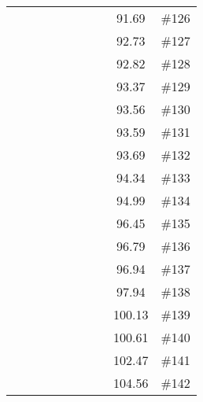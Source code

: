 \begin{longtable}{|c|c|c|c|c|c|c|c|c|c|}
 \x    & \x    &       & \x    &       &       &       & \x    & 91.69 & \#126 \\
 \x    & \x    & \x    &       &       & \x\m  &       &       & 92.73 & \#127 \\
 \x    & \x    &       & \x    &       &       & \x    &       & 92.82 & \#128 \\
 \x    & \x    &       & \x    &       & \x    & \x    &       & 93.37 & \#129 \\
 \x    & \x    &       & \x    &       &       & \x\m  &       & 93.56 & \#130 \\
 \x    & \x    &       & \x    &       & \x    &       & \x    & 93.59 & \#131 \\
 \x    & \x    &       & \x    &       &       &       &       & 93.69 & \#132 \\
 \x    & \x    &       &       &       &       &       & \x    & 94.34 & \#133 \\
 \x    & \x    &       &       &       &       &       &       & 94.99 & \#134 \\
 \x    & \x    &       & \x    &       &       &       & \x\m  & 96.45 & \#135 \\
 \x    & \x    &       &       &       & \x\m  &       &       & 96.79 & \#136 \\
 \x    & \x    &       &       &       &       & \x\m  &       & 96.94 & \#137 \\
 \x    & \x    &       &       &       & \x    &       &       & 97.94 & \#138 \\
 \x    & \x    &       & \x    &       & \x\m  &       & \x\m  & 100.13 & \#139 \\
 \x    & \x    &       & \x    &       & \x\m  & \x\m  &       & 100.61 & \#140 \\
 \x    & \x    &       &       &       & \x\m  & \x\m  &       & 102.47 & \#141 \\
 \x    & \x    &       &       &       & \x    &       & \x    & 104.56 & \#142 \\
\end{longtable}
\normalsize